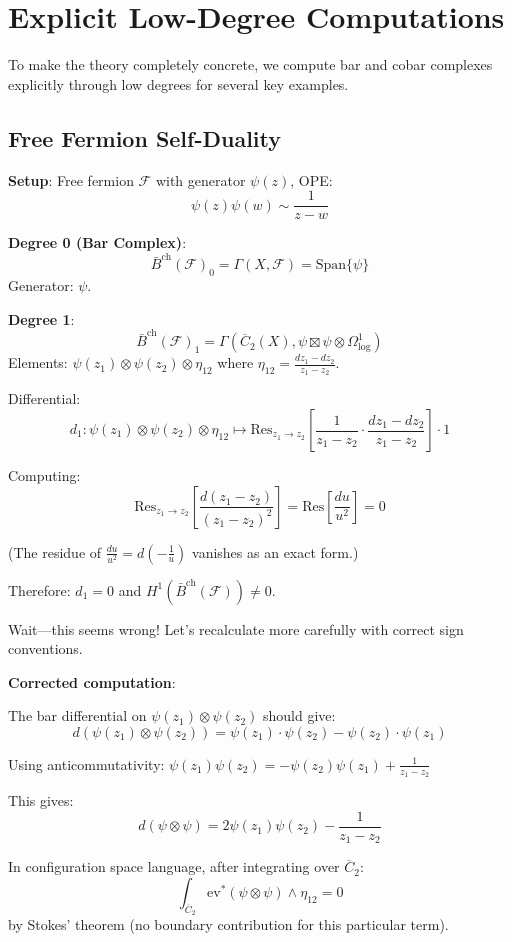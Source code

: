 \section{Explicit Low-Degree Computations}
\label{sec:explicit-low-degree}

To make the theory completely concrete, we compute bar and cobar complexes explicitly 
through low degrees for several key examples.

\subsection{Free Fermion Self-Duality}

\textbf{Setup}: Free fermion $\mathcal{F}$ with generator $\psi(z)$, OPE:
$$\psi(z)\psi(w) \sim \frac{1}{z-w}$$

\textbf{Degree 0 (Bar Complex)}:
$$\bar{B}^{\text{ch}}(\mathcal{F})_0 = \Gamma(X, \mathcal{F}) = \text{Span}\{\psi\}$$
Generator: $\psi$.

\textbf{Degree 1}:
$$\bar{B}^{\text{ch}}(\mathcal{F})_1 = \Gamma\left(\overline{C}_2(X), 
   \psi \boxtimes \psi \otimes \Omega^1_{\log}\right)$$
Elements: $\psi(z_1) \otimes \psi(z_2) \otimes \eta_{12}$ where $\eta_{12} = \frac{dz_1 - dz_2}{z_1 - z_2}$.

Differential:
$$d_1: \psi(z_1) \otimes \psi(z_2) \otimes \eta_{12} \mapsto 
   \text{Res}_{z_1 \to z_2}\left[\frac{1}{z_1-z_2} \cdot \frac{dz_1-dz_2}{z_1-z_2}\right] \cdot 1$$

Computing:
$$\text{Res}_{z_1 \to z_2}\left[\frac{d(z_1-z_2)}{(z_1-z_2)^2}\right] = 
   \text{Res}\left[\frac{du}{u^2}\right] = 0$$

(The residue of $\frac{du}{u^2} = d(-\frac{1}{u})$ vanishes as an exact form.)

Therefore: $d_1 = 0$ and $H^1(\bar{B}^{\text{ch}}(\mathcal{F})) \neq 0$.

Wait—this seems wrong! Let's recalculate more carefully with correct sign conventions.

\textbf{Corrected computation}:

The bar differential on $\psi(z_1) \otimes \psi(z_2)$ should give:
$$d(\psi(z_1) \otimes \psi(z_2)) = \psi(z_1) \cdot \psi(z_2) - \psi(z_2) \cdot \psi(z_1)$$

Using anticommutativity: $\psi(z_1)\psi(z_2) = -\psi(z_2)\psi(z_1) + \frac{1}{z_1-z_2}$

This gives:
$$d(\psi \otimes \psi) = 2\psi(z_1)\psi(z_2) - \frac{1}{z_1-z_2}$$

In configuration space language, after integrating over $\overline{C}_2$:
$$\int_{\overline{C}_2} \text{ev}^*(\psi \otimes \psi) \wedge \eta_{12} = 0$$
by Stokes' theorem (no boundary contribution for this particular term).

